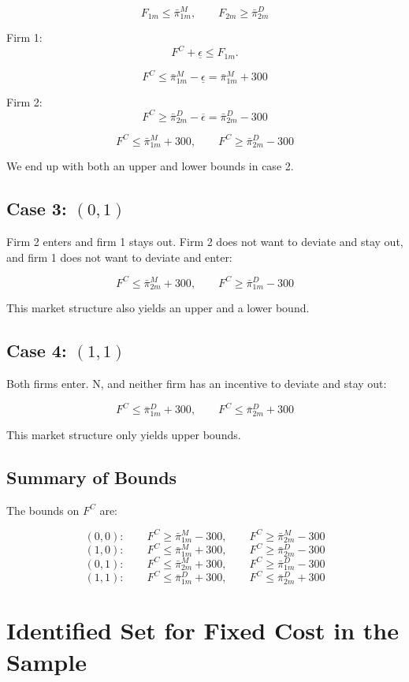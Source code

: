 \documentclass[12pt]{article}
\begin{document}
\[
F_{1m} \leq \bar{\pi}_{1m}^M,
\qquad
F_{2m} \geq \bar{\pi}_{2m}^D
\]

Firm 1:
\[
F^C + \underline{\epsilon} \leq F_{1m}.
\]

\[
F^C \leq \bar{\pi}_{1m}^M - \underline{\epsilon}
= \bar{\pi}_{1m}^M + 300
\]

Firm 2:
\[
F^C \geq \bar{\pi}_{2m}^D - \overline{\epsilon}
= \bar{\pi}_{2m}^D - 300
\]

\[
F^C \leq \bar{\pi}_{1m}^M + 300,
\qquad
F^C \geq \bar{\pi}_{2m}^D - 300
\]

We end up with both an upper and lower bounds in case 2.


\subsection*{Case 3: \((0,1)\)}

Firm 2 enters and firm 1 stays out. Firm 2 does not want to deviate and stay out, and firm 1 does not want to deviate and enter:

\[
F^C \leq \bar{\pi}_{2m}^M + 300,
\qquad
F^C \geq \bar{\pi}_{1m}^D - 300
\]

This market structure also yields an upper and a lower bound.

\subsection*{Case 4: \((1,1)\)}

Both firms enter. N, and neither firm has an incentive to deviate and stay out:

\[
F^C \leq \bar{\pi}_{1m}^D + 300,
\qquad
F^C \leq \bar{\pi}_{2m}^D + 300
\]

This market structure only yields upper bounds.

\subsection*{Summary of Bounds}

The bounds on \(F^C\) are:

\[
(0,0):
\qquad
F^C \geq \bar{\pi}_{1m}^M - 300,
\qquad
F^C \geq \bar{\pi}_{2m}^M - 300
\]
\[
(1,0):
\qquad
F^C \leq \bar{\pi}_{1m}^M + 300,
\qquad
F^C \geq \bar{\pi}_{2m}^D - 300
\]
\[
(0,1):
\qquad
F^C \leq \bar{\pi}_{2m}^M + 300,
\qquad
F^C \geq \bar{\pi}_{1m}^D - 300
\]
\[
(1,1):
\qquad
F^C \leq \bar{\pi}_{1m}^D + 300,
\qquad
F^C \leq \bar{\pi}_{2m}^D + 300
\]

\section{Identified Set for Fixed Cost in the Sample}
\end{document}
